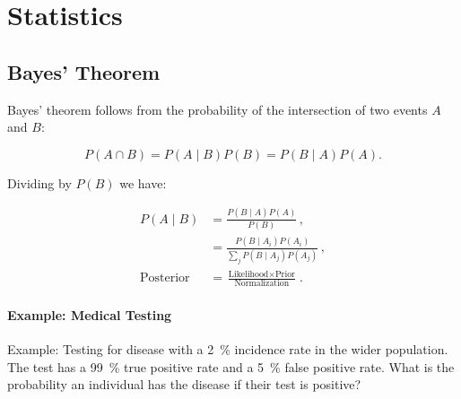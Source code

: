 \chapter{Statistics}
\label{chap:stats}

\section{Bayes' Theorem}
\label{stats:Bayes}

Bayes' theorem follows from the probability of the intersection of two events $A$ and $B$:

\begin{equation}\label{eq:stats:intersection}
P\left(A \cap B\right) = P\left(A \mid B\right) P\left(B\right) = P\left(B \mid A\right) P\left(A\right).
\end{equation}

\noindent Dividing by $P\left(B\right)$ we have:

\begin{equation}\label{eq:stats:Bayes}
\begin{split}
P\left(A \mid B\right) &= \frac{P\left(B \mid A\right) P\left(A\right)}{P\left(B\right)}\,, \\
&= \frac{P\left(B \mid A_{i}\right) P\left(A_{i}\right)}{\sum_{j} P\left(B \mid A_{j}\right)P\left(A_{j}\right)}\,, \\
\text{Posterior} &= \frac{\text{Likelihood} \times \text{Prior}}{\text{Normalization}}\,.
\end{split}
\end{equation}

\subsubsection{Example: Medical Testing}
\label{stats:Bayes:medical_test}

Example: Testing for disease with a \SI{2}{\percent} incidence rate in the wider population.
The test has a \SI{99}{\percent} true positive rate and a \SI{5}{\percent} false positive rate.
What is the probability an individual has the disease if their test is positive?

